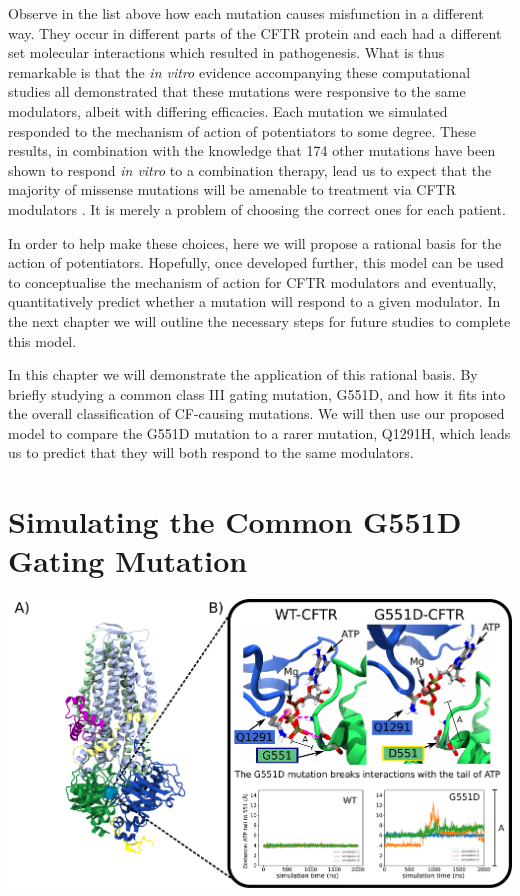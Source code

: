 Observe in the list above how each mutation causes misfunction in a different way. They occur in different parts of the CFTR protein and each had a different set molecular interactions which resulted in pathogenesis. What is thus remarkable is that the \textit{in vitro} evidence accompanying these computational studies all demonstrated that these mutations were responsive to the same modulators, albeit with differing efficacies. Each mutation we simulated responded to the mechanism of action of potentiators to some degree. These results, in combination with the knowledge that 174 other mutations have been shown to respond \textit{in vitro} to a combination therapy, lead us to expect that the majority of missense mutations will be amenable to treatment via CFTR modulators \cite{trikafta_FDA_info}. It is merely a problem of choosing the correct ones for each patient.

In order to help make these choices, here we will propose a rational basis for the action of potentiators. Hopefully, once developed further, this model can be used to conceptualise the mechanism of action for CFTR modulators and eventually, quantitatively predict whether a mutation will respond to a given modulator. In the next chapter we will outline the necessary steps for future studies to complete this model. 

In this chapter we will demonstrate the application of this rational basis. By briefly studying a common class III gating mutation, G551D, and how it fits into the overall classification of CF-causing mutations. We will then use our proposed model to compare the G551D mutation to a rarer mutation, Q1291H, which leads us to predict that they will both respond to the same modulators. 

\section{Simulating the Common G551D Gating Mutation}

	\begin{center}
		\includegraphics[width=\textwidth]{figures/perspective/G551D.pdf}
	\end{center}

